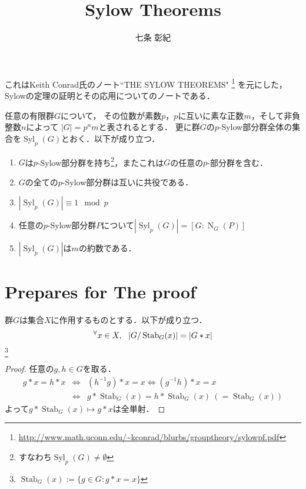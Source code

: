 \documentclass[a4paper]{jsarticle}
\title{Sylow Theorems}
\author{七条 彰紀}
\newcommand{\Stab}{\operatorname{Stab}}
\newcommand{\Norm}{\operatorname{N}}
\newcommand{\Syl}{\operatorname{Syl}}
\begin{document}
\maketitle
これはKeith Conrad氏のノート``THE SYLOW THEOREMS"
\footnote{\url{http://www.math.uconn.edu/~kconrad/blurbs/grouptheory/sylowpf.pdf}}
を元にした，Sylowの定理の証明とその応用についてのノートである．

\begin{Thm}
    任意の有限群$G$について，
    その位数が素数$p$，$p$に互いに素な正数$m$，そして非負整数$n$によって
    $|G|=p^{n}m$と表されるとする．
    更に群$G$の$p$-Sylow部分群全体の集合を$\Syl_p(G)$とおく．以下が成り立つ．
    \begin{enumerate}
        \renewcommand{\labelenumi}{\Roman{enumi}.}
        \item $G$は$p$-Sylow部分群を持ち\footnote{すなわち$\Syl_p(G) \neq \emptyset$}，またこれは$G$の任意の$p$-部分群を含む．
        \item $G$の全ての$p$-Sylow部分群は互いに共役である．
        \item $|\Syl_p(G)| \equiv 1 \mod p$
        \item 任意の$p$-Sylow部分群$P$について$|\Syl_p(G)| = [G:\Norm_G(P)]$
        \item $|\Syl_p(G)|$は$m$の約数である．
    \end{enumerate}
\end{Thm}

\section{Prepares for The proof}
    \begin{Thm}
        群$G$は集合$X$に作用するものとする．以下が成り立つ．
        \[ \Forall{x \in  X} |G / \Stab_G(x)|=|G \ast x| \]
        \footnote{$\Stab_G(x):=\{g \in G : g \ast x=x \}$}
    \end{Thm}
    \begin{proof}
        任意の$g, h \in G$を取る．
        \begin{eqnarray*}
            g \ast x=h \ast x
                &\iff& (h^{-1}g) \ast x=x \iff (g^{-1}h) \ast x=x \\
                &\iff& g \ast \Stab_G(x)= h \ast \Stab_G(x) ~(=\Stab_G(x))
        \end{eqnarray*}
        よって$g \ast \Stab_G(x) \mapsto g \ast x$は全単射．
    \end{proof}
\end{document}
